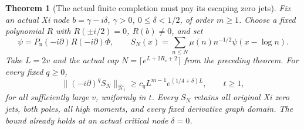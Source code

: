 \documentclass[11pt]{article}
\newtheorem{theorem}{Theorem}
\theoremstyle{remark}\newtheorem{remark}[theorem]{Remark}
\begin{document}
\begin{theorem}[The actual finite completion must pay its escaping zero jets]
\label{thm:escaping-completion-cost}
Fix an actual Xi node \(b=\gamma-i\delta\), \(\gamma>0\),
\(0\le\delta<1/2\), of order \(m\ge1\).
Choose a fixed polynomial \(R\) with \(R(\pm i/2)=0\),
\(R(b)\ne0\), and set
\[
 \psi=P_{\mathrm n}(-i\partial)R(-i\partial)\Phi,\qquad
 S_N(x)=\sum_{n\le N}\mu(n)n^{-1/2}\psi(x-\log n).              \tag{NHA5}
\]
Take \(L=2v\) and the actual cap \(N=\lceil e^{L+2R_v+2}\rceil\)
from the preceding theorem. For every fixed \(q\ge0\),
\[
 \|(-i\partial)^qS_N\|_{\widehat{\mathcal H}_t}
           \ge c_qL^{m-1}e^{(1/4+\delta)L},
                   \qquad t\ge1,                             \tag{NHA6}
\]
for all sufficiently large \(v\), uniformly in \(t\).
Every \(S_N\) retains all original Xi zero jets, both poles,
all high moments, and every fixed derivative graph domain.
The bound already holds at an actual critical node \(\delta=0\).
\end{theorem}
\end{document}

